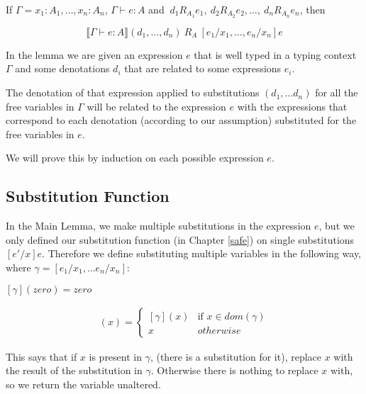 \vspace{0.5cm}

\begin{lem} \label{main}
If $\Gamma = x_1 : A_1, \dots, x_n : A_n$, $\Gamma \vdash e : A$ and $ \ d_1 R_{A_1} e_1, \ d_2 R_{A_2} e_2, \dots , \  d_n   R_{A_n} e_n$, then

\[ \llbracket \Gamma \vdash e : A \rrbracket (d_1, \dots, d_n)  \ R_A \  [e_1/x_1, \dots, e_n/x_n]e \]
\end{lem}

In the lemma we are given an expression $e$ that is well typed in a typing context $\Gamma$ and some denotations $d_i$ that are related to some expressions $e_i$.

The denotation of that expression applied to substitutions $(d_1, \dots d_n)$ for all the  free variables in $\Gamma$ will be related to the expression $e$ with the expressions that correspond to each denotation (according to our assumption) substituted for the free variables in $e$.

We will prove this by induction on each possible expression $e$.

\subsection{Substitution Function}
In the Main Lemma, we make multiple substitutions in the expression $e$, but we only defined our substitution function (in Chapter \ref{safe}) on single substitutions $[e'/x]e$. Therefore we define substituting multiple variables in the following way, where $\gamma = [e_1/x_1, \dots e_n/x_n]$:

\begin{adjustwidth}{2cm}{}
$[\gamma](zero) = zero$
\end{adjustwidth}

\begin{minipage}{3.5in}
\begin{align*}
[\gamma](x) = 
  \begin{cases} 
           [\gamma](x) & \text{if } x \in dom(\gamma) \\
           x & otherwise 
  \end{cases}
\end{align*} 
\end{minipage}

This says that if $x$ is present in $\gamma$, (there is a substitution for it), replace $x$ with the result of the substitution in $\gamma$. Otherwise there is nothing to replace $x$ with, so we return the variable unaltered. 

